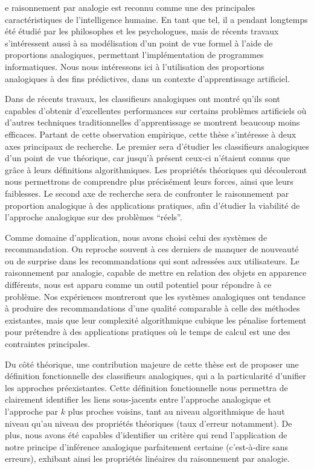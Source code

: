 e raisonnement par analogie est reconnu comme une des principales
caractéristiques de l'intelligence humaine. En tant que tel, il a pendant
longtemps été étudié par les philosophes et les psychologues, mais de récents
travaux s'intéressent aussi à sa modélisation d'un point de vue formel à l'aide
de proportions analogiques, permettant l'implémentation de programmes
informatiques. Nous nous intéressons ici à l'utilisation des proportions
analogiques à des fins prédictives, dans un contexte d'apprentissage
artificiel.

Dans de récents travaux, les classifieurs analogiques ont montré qu'ils sont
capables d'obtenir d'excellentes performances sur certains problèmes
artificiels où d'autres techniques traditionnelles d'apprentissage se montrent
beaucoup moins efficaces. Partant de cette observation empirique, cette thèse
s'intéresse à deux axes principaux de recherche. Le premier sera d'étudier les
classifieurs analogiques d'un point de vue théorique, car jusqu'à présent
ceux-ci n'étaient connus que grâce à leurs définitions algorithmiques. Les
propriétés théoriques qui découleront nous permettrons de comprendre plus
précisément leurs forces, ainsi que leurs faiblesses. Le second axe de
recherche sera de confronter le raisonnement par proportion analogique à des
applications pratiques, afin d'étudier la viabilité de l'approche analogique
sur des problèmes ``réels''.

Comme domaine d'application, nous avons choisi celui des systèmes de
recommandation. On reproche souvent à ces derniers de manquer de nouveauté ou
de surprise dans les recommandations qui sont adressées aux utilisateurs. Le
raisonnement par analogie, capable de mettre en relation des objets en
apparence différents, nous est apparu comme un outil potentiel pour répondre à
ce problème. Nos expériences montreront que les systèmes analogiques ont
tendance à produire des recommandations d'une qualité comparable à celle des
méthodes existantes, mais que leur complexité algorithmique cubique les
pénalise fortement pour prétendre à des applications pratiques où le temps de
calcul est une des contraintes principales.

Du côté théorique, une contribution majeure de cette thèse est de proposer une
définition fonctionnelle des classifieurs analogiques, qui a la particularité
d'unifier les approches préexistantes. Cette définition fonctionnelle nous
permettra de clairement identifier les liens sous-jacents entre l'approche
analogique et l'approche par $k$ plus proches voisins, tant au niveau
algorithmique de haut niveau qu'au niveau des propriétés théoriques (taux
d'erreur notamment). De plus, nous avons été capables d'identifier un critère
qui rend l'application de notre principe d'inférence analogique parfaitement
certaine (c'est-à-dire sans erreurs),  exhibant ainsi les propriétés linéaires
du raisonnement par analogie.

